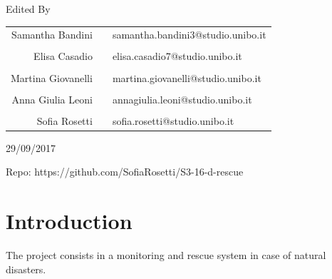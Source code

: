 \documentclass[a4paper,12pt]{report}
\begin{document}
\begin{titlepage}
	\vspace*{4\baselineskip} %
	
	
	\large Edited By
	
	\vspace{1.9\baselineskip} %
		
	\begin{tabular}{ r c l } 
\Large Samantha Bandini &   & \Large samantha.bandini3@studio.unibo.it \\
\\
\Large Elisa Casadio &   & \Large elisa.casadio7@studio.unibo.it \\
\\
\Large Martina Giovanelli &   & \Large martina.giovanelli@studio.unibo.it \\
\\
\Large Anna Giulia Leoni &   & \Large annagiulia.leoni@studio.unibo.it \\
\\
\Large Sofia Rosetti &   & \Large sofia.rosetti@studio.unibo.it
\end{tabular}
	
	\vspace{0.5\baselineskip} %
	
	
	\vfill %
	
	
	\vspace{0.3\baselineskip} %
	
	29/09/2017 %
	
	Repo: https://github.com/SofiaRosetti/S3-16-d-rescue %

\end{titlepage}


\tableofcontents

\chapter{Introduction}

The project consists in a monitoring and rescue system in case of natural disasters. 
\end{document}
